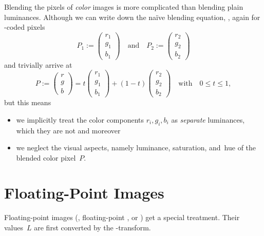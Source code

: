 Blending the pixels of \emph{color} images is more complicated than blending plain luminances.
Although we can write down the na\"ive blending equation, ,
again for -coded pixels
\[
  P_1 := \left(\begin{array}{c}r_1\\ g_1\\ b_1\end{array}\right)
  \quad \mbox{and}\quad
  P_2 := \left(\begin{array}{c}r_2\\ g_2\\ b_2\end{array}\right)
\]
and trivially arrive at
\begin{equation}\label{equ:trivial-rgb-blend}
  P :=
  \left(\begin{array}{c}r\\ g\\ b\end{array}\right) =
    t \left(\begin{array}{c}r_1\\ g_1\\ b_1\end{array}\right) +
    (1 - t) \left(\begin{array}{c}r_2\\ g_2\\ b_2\end{array}\right)
    \quad \mbox{with} \quad 0 \leq t \leq 1,
\end{equation}
but this means

\begin{itemize}
\item
  we implicitly treat the color components $r_i, g_i, b_i$ as \emph{separate} luminances, which
  they are not and moreover

\item
  we neglect the visual aspects, namely luminance, saturation, and~hue of the blended color
  pixel~$P$.
\end{itemize}


\section[Floating-Point Images]{\label{sec:floating-point-images}%
  Floating-Point Images}

Floating-point images
(, floating-point , or ) get a special treatment.  Their values~$L$ are first converted
by the \LogTransform-transform.

